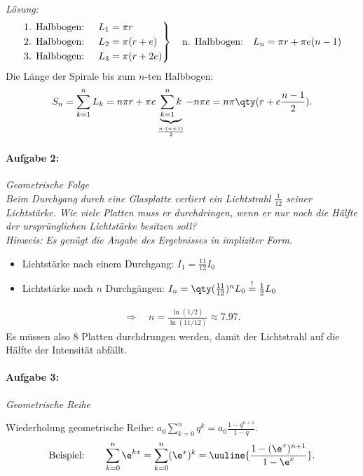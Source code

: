 \emph{Lösung:}
\begin{align}
    \begin{rcases}
        \text{1. Halbbogen: } & L_1 = \pi r \\
        \text{2. Halbbogen: } & L_2 = \pi (r+e) \\
        \text{3. Halbbogen: } & L_3 = \pi (r+2e) \\
    \end{rcases} \quad \text{n. Halbbogen:}\quad L_n = \pi r + \pi e (n-1) 
\end{align}
Die Länge der Spirale bis zum $n$-ten Halbbogen: 
\begin{align}
    S_n = \sum_{k=1}^n L_k = n\pi r + \pi e \underbrace{\sum_{k=1}^n k}_{\frac{n\cdot(n+1)}{2}} - n \pi e = n\pi \qty(r + e \frac{n-1}{2}). 
\end{align}
%
\paragraph{Aufgabe 2: } \emph{Geometrische Folge}\\[0.2cm]
\emph{Beim Durchgang durch eine Glasplatte verliert ein Lichtstrahl $\textstyle\frac{1}{12}$ seiner Lichtstärke. Wie viele Platten muss er durchdringen, wenn er nur noch die Hälfte der ursprünglichen Lichtstärke besitzen soll?}\\[0.2cm]
\emph{Hinweis:} \emph{Es genügt die Angabe des Ergebnisses in impliziter Form.}
\begin{itemize}
    \item Lichtstärke nach einem Durchgang: $I_1 = \frac{11}{12} I_0$
    \item Lichtstärke nach $n$ Durchgängen: $I_n = \qty(\frac{11}{12})^n L_0 \overset{!}{=} \frac{1}{2} L_0$
\end{itemize}
\begin{align}
    \Rightarrow \quad n = \frac{\ln(1/2)}{\ln(11/12)} \approx 7.97.
\end{align}
Es müssen also 8 Platten durchdrungen werden, damit der Lichtstrahl auf die Hälfte der Intensität abfällt.
%
\paragraph{Aufgabe 3: } \emph{Geometrische Reihe}

Wiederholung geometrische Reihe: $a_0 \sum_{k=0}^n q^k = a_0\frac{1-q^{n+1}}{1-q}$.
\begin{align}
    \text{Beispiel:} \qquad \sum_{k=0}^n \e^{kx} = \sum_{k=0}^n (\e^x)^k = \uuline{\frac{1-(\e^{x})^{n+1}}{1-\e^{x}}}.
\end{align}

